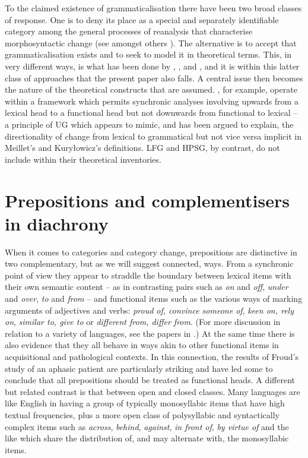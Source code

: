 \documentclass[output=paper]{langsci/langscibook}
\begin{document}
To the claimed existence of grammaticalisation there have been two broad
classes of response. One is to deny its place as a special and separately
identifiable category among the general processes of reanalysis that
characterise morphosyntactic change (see amongst others \citealt{Campbell01,
Joseph01, Newmeyer01}). The alternative is to accept that grammaticalisation
exists and to seek to model it in theoretical terms. This, in very different
ways, is what has been done by \textcite{HeinClauHunn91},
\textcite{RobRou2003}, \textcite{vanGelderen11} and \textcite{TrauTrou13}, and
it is within this latter class of approaches that the present paper also falls.
A central issue then becomes the nature of the theoretical constructs that are
assumed. \textcite{RobRou2003}, for example, operate within a framework which
permits synchronic analyses involving  upwards from a lexical head to a
functional head but not downwards from functional to lexical -- a principle of
\gls{UG} which appears to mimic, and has been argued to explain, the
directionality of change from lexical to grammatical but not vice versa
implicit in Meillet's and Kury\l{}owicz's definitions. \gls{LFG} and \gls{HPSG}, by contrast, do not include 
within their theoretical inventories.

\section{Prepositions and complementisers in diachrony}

When it comes to categories and category change, prepositions are distinctive
in two complementary, but as we will suggest connected, ways. From a synchronic
point of view they appear to straddle the boundary between lexical items with
their own semantic content -- as in contrasting pairs such as \emph{on} and
\emph{off}, \emph{under} and \emph{over}, \emph{to} and \emph{from} -- and
functional items such as the various ways of marking arguments of adjectives
and verbs: \emph{proud of, convince someone of}, \emph{keen on, rely
on}, \emph{similar to, give to} or \emph{different from, differ from}. (For
more discussion in relation to a variety of languages, see the papers in
\citealt{SaintDizier06, Asburyetal08, Francoisetal09, CinqRizz10}.) At the same
time there is also evidence that they all behave in ways akin to other
functional items in acquisitional and pathological contexts. In this
connection, the results of Froud's \citeyearpar{Froud01} study of an aphasic
patient are particularly striking and have led some to conclude that all
prepositions should be treated as functional heads. A different but related
contrast is that between open and closed classes. Many languages are like
English in having a group of typically monosyllabic items that have high
textual frequencies, plus a more open class of polysyllabic and syntactically
complex items such as \emph{across}, \emph{behind}, \emph{against}, \emph{in
front of}, \emph{by virtue of}  and the like which share the distribution of,
and may alternate with, the monosyllabic items.
\end{document}
